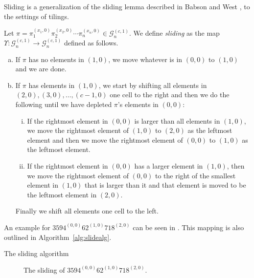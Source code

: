Sliding is a generalization of the sliding lemma described in Babson and West \cite{slide}, to the settings of tilings.

\begin{definition}
Let $\pi = \pi_1^{(x_1,0)}\pi_2^{(x_2,0)}\cdots\pi_n^{(x_n,0)} \in \mathcal{G}^{(c,1)}_n$. We define \emph{sliding} as the map $\Upsilon: \mathcal{G}^{(c,1)}_n \to \mathcal{G}^{(c,1)}_n$ defined as follows.
\begin{enumerate}[a)]
    \item If $\pi$ has no elements in $(1,0)$, we move whatever is in $(0,0)$ to $(1,0)$ and we are done.
    \item If $\pi$ has elements in $(1,0)$, we start by shifting all elements in $(2,0), (3,0), \dotsc, (c-1,0)$ one cell to the right and then we do the following until we have depleted $\pi$'s elements in $(0,0)$:
    \begin{enumerate}[i.]
        \item If the rightmost element in $(0,0)$ is larger than all elements in $(1,0)$, we move the rightmost element of $(1,0)$ to $(2,0)$ as the leftmost element and then we move the rightmost element of $(0,0)$ to $(1,0)$ as the leftmost element.
        \item If the rightmost element in $(0,0)$ has a larger element in $(1,0)$, then we move the rightmost element of $(0,0)$ to the right of the smallest element in $(1,0)$ that is larger than it and that element is moved to be the leftmost element in $(2,0)$.
    \end{enumerate}
    Finally we shift all elements one cell to the left.
\end{enumerate}
\end{definition}

An example for $3594^{(0,0)}62^{(1,0)}718^{(2,0)}$ can be seen in . This mapping is also outlined in Algorithm~\ref{alg:slidealg}.

\begin{algorithm}

\caption{The sliding algorithm}
\label{alg:slidealg}
\end{algorithm}

\begin{figure}[ht!]
    \centering
    
    \caption{The sliding of $3594^{(0,0)}62^{(1,0)}718^{(2,0)}$.}
    \label{fig:slide_gp_example}
\end{figure}

